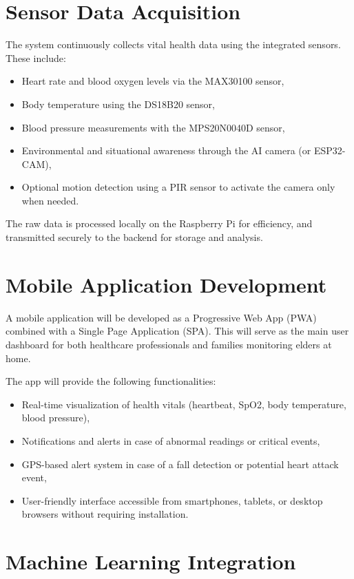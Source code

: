 \section{Sensor Data Acquisition}
The system continuously collects vital health data using the integrated sensors. 
These include:
\begin{itemize}
    \item Heart rate and blood oxygen levels via the MAX30100 sensor,
    \item Body temperature using the DS18B20 sensor,
    \item Blood pressure measurements with the MPS20N0040D sensor,
    \item Environmental and situational awareness through the AI camera (or ESP32-CAM),
    \item Optional motion detection using a PIR sensor to activate the camera only when needed.
\end{itemize}

The raw data is processed locally on the Raspberry Pi for efficiency, and transmitted securely to the backend for storage and analysis.

\section{Mobile Application Development}
A mobile application will be developed as a Progressive Web App (PWA) combined with a Single Page Application (SPA). 
This will serve as the main user dashboard for both healthcare professionals and families monitoring elders at home.

The app will provide the following functionalities:
\begin{itemize}
    \item Real-time visualization of health vitals (heartbeat, SpO2, body temperature, blood pressure),
    \item Notifications and alerts in case of abnormal readings or critical events,
    \item GPS-based alert system in case of a fall detection or potential heart attack event,
    \item User-friendly interface accessible from smartphones, tablets, or desktop browsers without requiring installation.
\end{itemize}

\section{Machine Learning Integration}

